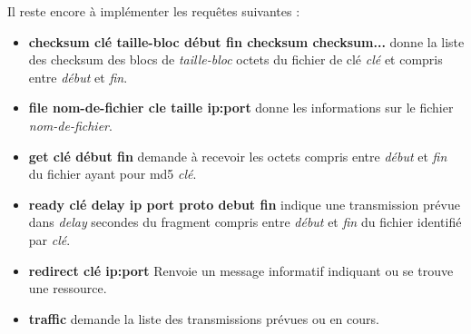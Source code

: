         Il reste encore à implémenter les requêtes suivantes :
\begin{itemize}
\item{\textbf{checksum clé taille-bloc début fin checksum checksum...}} donne la liste des checksum des blocs de
 \textit{taille-bloc} octets du fichier de clé \textit{clé} et compris entre 
\textit{début} et \textit{fin}.

\item{\textbf{file nom-de-fichier cle taille ip:port}} donne les informations 
sur le fichier \textit{nom-de-fichier}.

\item{\textbf{get clé début fin}} demande à recevoir les octets compris entre 
\textit{début} et \textit{fin} du 
fichier ayant pour md5 \textit{clé}.

\item{\textbf{ready clé delay ip port proto debut fin}} indique une 
transmission prévue dans \textit{delay} secondes 
du fragment compris entre \textit{début} et \textit{fin} du fichier identifié 
par \textit{clé}.

\item{\textbf{redirect clé ip:port}} Renvoie un message informatif indiquant ou se trouve une ressource.

\item{\textbf{traffic}} demande la liste des transmissions prévues ou en cours.

\end{itemize}
